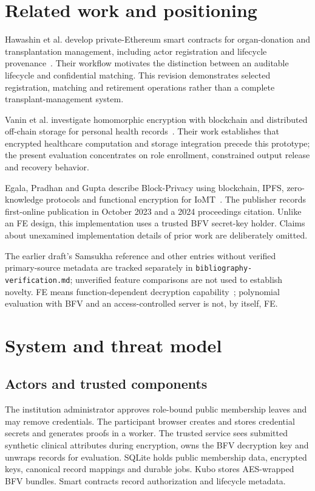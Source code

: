 \documentclass[11pt,a4paper]{article}
\begin{document}
\section{Related work and positioning}
Hawashin et al. develop private-Ethereum smart contracts for organ-donation and transplantation management, including actor registration and lifecycle provenance~\cite{hawashin}. Their workflow motivates the distinction between an auditable lifecycle and confidential matching. This revision demonstrates selected registration, matching and retirement operations rather than a complete transplant-management system.

Vanin et al. investigate homomorphic encryption with blockchain and distributed off-chain storage for personal health records~\cite{vanin}. Their work establishes that encrypted healthcare computation and storage integration precede this prototype; the present evaluation concentrates on role enrollment, constrained output release and recovery behavior.

Egala, Pradhan and Gupta describe Block-Privacy using blockchain, IPFS, zero-knowledge protocols and functional encryption for IoMT~\cite{egala}. The publisher records first-online publication in October 2023 and a 2024 proceedings citation. Unlike an FE design, this implementation uses a trusted BFV secret-key holder. Claims about unexamined implementation details of prior work are deliberately omitted.

The earlier draft's Samsukha reference and other entries without verified primary-source metadata are tracked separately in \texttt{bibliography-verification.md}; unverified feature comparisons are not used to establish novelty. FE means function-dependent decryption capability~\cite{fe}; polynomial evaluation with BFV and an access-controlled server is not, by itself, FE.

\section{System and threat model}
\subsection{Actors and trusted components}
The institution administrator approves role-bound public membership leaves and may remove credentials. The participant browser creates and stores credential secrets and generates proofs in a worker. The trusted service sees submitted synthetic clinical attributes during encryption, owns the BFV decryption key and unwraps records for evaluation. SQLite holds public membership data, encrypted keys, canonical record mappings and durable jobs. Kubo stores AES-wrapped BFV bundles. Smart contracts record authorization and lifecycle metadata.
\end{document}
